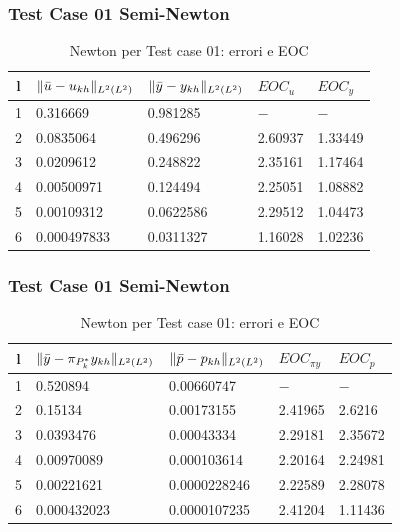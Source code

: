 \documentclass{beamer}
\theoremstyle{definition}
\theoremstyle{remark}
\theoremstyle{plain}
\theoremstyle{definition}
\DeclarePairedDelimiter{\norma}{\lVert}{\rVert}
\begin{document}
\begin{frame}
\frametitle{Test Case 01 Semi-Newton}

\begin{table}
\caption{Newton per Test case 01: errori e EOC }
\label{newtonI}
\centering

\begin{tabular}{cllll}
\toprule
{l}           &  {$ \norma{\bar{u}-u_{kh}}_{L^2(L^2)} $} &  {$ \norma{\bar{y}-y_{kh}}_{L^2(L^2)} $} &  {$ EOC_u $} &  {$ EOC_y $} \\
\midrule
1            &  0.316669 &  0.981285 &  {$-$} &  {$-$} \\
2            &  0.0835064 &  0.496296 &  2.60937 &  1.33449 \\
3            &  0.0209612 &  0.248822 &  2.35161 &  1.17464 \\
4            &  0.00500971 &  0.124494  &  2.25051 &  1.08882 \\
5            &  0.00109312 &  0.0622586 &  2.29512 &  1.04473 \\
6            &  0.000497833 &  0.0311327 &  1.16028 &  1.02236 \\
\bottomrule
\end{tabular}              
\end{table}

\end{frame}

\begin{frame}
\frametitle{Test Case 01 Semi-Newton}
\begin{table}
\caption{Newton per Test case 01: errori e EOC }
\label{newtonIbis}
\centering

\begin{tabular}{cllll}
\toprule
{l}           &  {$ \norma{\bar{y}-\pi_{P^*_k}y_{kh}}_{L^2(L^2)} $} & {$ \norma{\bar{p}-p_{kh}}_{L^2(L^2)} $} &  {$ EOC_{\pi y} $}  &  {$ EOC_p $} \\
\midrule
1            &  0.520894 &  0.00660747 &  {$-$} &  {$-$} \\
2            &  0.15134 &  0.00173155 &  2.41965 &  2.6216 \\
3            &  0.0393476 &  0.00043334 &  2.29181 &  2.35672 \\
4            &  0.00970089 &  0.000103614 &  2.20164 &  2.24981 \\
5            &  0.00221621 &  0.0000228246 &  2.22589 &  2.28078 \\
6            &  0.000432023 &  0.0000107235 &  2.41204 &  1.11436 \\
\bottomrule
\end{tabular}              
\end{table}

\end{frame}
\end{document}
